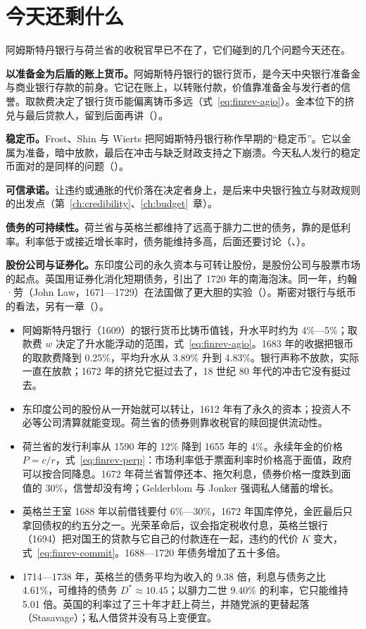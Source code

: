 \section{今天还剩什么}\label{sec:finrev-legacy}

阿姆斯特丹银行与荷兰省的收税官早已不在了，它们碰到的几个问题今天还在。

\textbf{以准备金为后盾的账上货币。}阿姆斯特丹银行的银行货币，是今天中央银行准备金与商业银行存款的前身。它记在账上，以转账付款，价值靠准备金与发行者的信誉。取款费决定了银行货币能偏离铸币多远（式~\eqref{eq:finrev-agio}）。金本位下的挤兑与最后贷款人，留到后面再讲（）。

\textbf{稳定币。}Frost、Shin 与 Wierts 把阿姆斯特丹银行称作早期的“稳定币”。它以金属为准备，暗中放款，最后在冲击与缺乏财政支持之下崩溃\cite{fsw2020}。今天私人发行的稳定币面对的是同样的问题（）。

\textbf{可信承诺。}让违约或通胀的代价落在决定者身上，是后来中央银行独立与财政规则的出发点（第~\ref{ch:credibility}、\ref{ch:budget}~章）。

\textbf{债务的可持续性。}荷兰省与英格兰都维持了远高于腓力二世的债务，靠的是低利率。利率低于或接近增长率时，债务能维持多高，后面还要讨论（、）。

\textbf{股份公司与证券化。}东印度公司的永久资本与可转让股份，是股份公司与股票市场的起点。英国用证券化消化短期债务，引出了 1720 年的南海泡沫。同一年，约翰·劳（John Law，1671—1729）在法国做了更大胆的实验（）。斯密对银行与纸币的看法，另有一章（）。

\begin{takeaways}
\begin{itemize}
\item 阿姆斯特丹银行（1609）的银行货币比铸币值钱，升水平时约为 4\%—5\%；取款费 $w$ 决定了升水能浮动的范围，式~\eqref{eq:finrev-agio}。1683 年的收据把银币的取款费降到 0.25\%，平均升水从 3.89\% 升到 4.83\%。银行声称不放款，实际一直在放款；1672 年的挤兑它挺过去了，18 世纪 80 年代的冲击它没有挺过去。
\item 东印度公司的股份从一开始就可以转让，1612 年有了永久的资本；投资人不必等公司清算就能变现。荷兰省的债券则靠收税官的赎回提供流动性。
\item 荷兰省的发行利率从 1590 年的 12\% 降到 1655 年的 4\%。永续年金的价格 $P=c/r$，式~\eqref{eq:finrev-perp}：市场利率低于票面利率时价格高于面值，政府可以按合同降息。1672 年荷兰省暂停还本、拖欠利息，债券价格一度跌到面值的 30\%，信誉却没有垮；Gelderblom 与 Jonker 强调私人储蓄的增长。
\item 英格兰王室 1688 年以前借钱要付 6\%—30\%，1672 年国库停兑，金匠最后只拿回债权的约五分之一。光荣革命后，议会指定税收付息，英格兰银行（1694）把对国王的贷款与它自己的付款连在一起，违约的代价 $K$ 变大，式~\eqref{eq:finrev-commit}。1688—1720 年债务增加了五十多倍。
\item 1714—1738 年，英格兰的债务平均为收入的 9.38 倍，利息与债务之比 4.61\%，可维持的债务 $D^{*}\approx10.45$；以腓力二世 9.40\% 的利率，它只能维持 5.01 倍。英国的利率过了三十年才赶上荷兰，并随党派的更替起落（Stasavage）；私人借贷并没有马上变便宜。
\end{itemize}
\end{takeaways}

